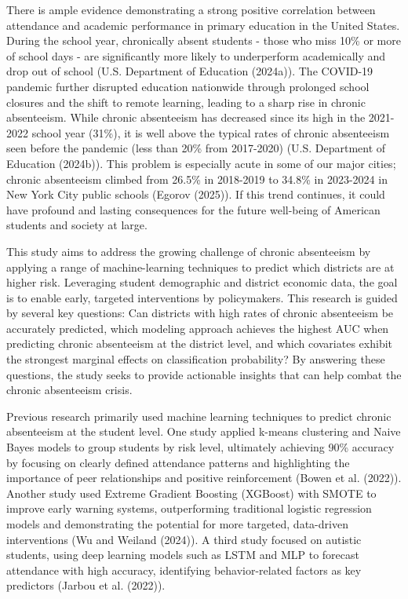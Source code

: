 \documentclass[
  11pt,
]{article}
\begin{document}
There is ample evidence demonstrating a strong positive correlation
between attendance and academic performance in primary education in the
United States. During the school year, chronically absent students -
those who miss 10\% or more of school days - are significantly more
likely to underperform academically and drop out of school (U.S.
Department of Education (2024a)). The COVID-19 pandemic further
disrupted education nationwide through prolonged school closures and the
shift to remote learning, leading to a sharp rise in chronic
absenteeism. While chronic absenteeism has decreased since its high in
the 2021-2022 school year (31\%), it is well above the typical rates of
chronic absenteeism seen before the pandemic (less than 20\% from
2017-2020) (U.S. Department of Education (2024b)). This problem is
especially acute in some of our major cities; chronic absenteeism
climbed from 26.5\% in 2018-2019 to 34.8\% in 2023-2024 in New York City
public schools (Egorov (2025)). If this trend continues, it could have
profound and lasting consequences for the future well-being of American
students and society at large.

This study aims to address the growing challenge of chronic absenteeism
by applying a range of machine-learning techniques to predict which
districts are at higher risk. Leveraging student demographic and
district economic data, the goal is to enable early, targeted
interventions by policymakers. This research is guided by several key
questions: Can districts with high rates of chronic absenteeism be
accurately predicted, which modeling approach achieves the highest AUC
when predicting chronic absenteeism at the district level, and which
covariates exhibit the strongest marginal effects on classification
probability? By answering these questions, the study seeks to provide
actionable insights that can help combat the chronic absenteeism crisis.

Previous research primarily used machine learning techniques to predict
chronic absenteeism at the student level. One study applied k-means
clustering and Naive Bayes models to group students by risk level,
ultimately achieving 90\% accuracy by focusing on clearly defined
attendance patterns and highlighting the importance of peer
relationships and positive reinforcement (Bowen et al. (2022)). Another
study used Extreme Gradient Boosting (XGBoost) with SMOTE to improve
early warning systems, outperforming traditional logistic regression
models and demonstrating the potential for more targeted, data-driven
interventions (Wu and Weiland (2024)). A third study focused on autistic
students, using deep learning models such as LSTM and MLP to forecast
attendance with high accuracy, identifying behavior-related factors as
key predictors (Jarbou et al. (2022)).
\end{document}
